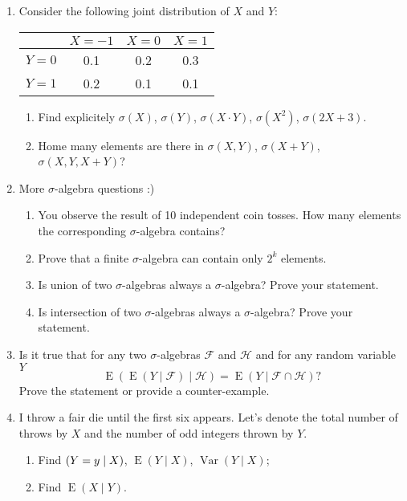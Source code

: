 \documentclass[12pt]{article}
\DeclareMathOperator{\Var}{Var}
\DeclareMathOperator{\E}{E}
\let\P\relax
\DeclareMathOperator{\P}{\mathbb{P}}
\begin{document}
\begin{enumerate}

\item 
  Consider the following joint distribution of $X$ and $Y$:

  \begin{tabular}{*{4}{c}}
  \toprule
  & $X=-1$ & $X=0$ & $X=1$ \\
  \midrule
  $Y=0$ & 0.1 & 0.2 & 0.3  \\
  $Y=1$ & 0.2 & 0.1 & 0.1  \\
  \bottomrule
  \end{tabular}
  
  \begin{enumerate}
   \item Find explicitely $\sigma(X)$, $\sigma(Y)$, $\sigma(X \cdot Y)$, $\sigma(X^2)$, $\sigma(2X+3)$.
   \item Home many elements are there in $\sigma(X, Y)$, $\sigma(X + Y)$, $\sigma(X, Y, X+Y)$?
  \end{enumerate}
  

\item More $\sigma$-algebra questions :)
\begin{enumerate}
  \item You observe the result of 10 independent coin tosses. How many elements the corresponding $\sigma$-algebra contains?
  \item Prove that a finite $\sigma$-algebra can contain only $2^k$ elements.
  \item Is union of two $\sigma$-algebras always a $\sigma$-algebra? Prove your statement.
  \item Is intersection of two $\sigma$-algebras always a $\sigma$-algebra? Prove your statement.
\end{enumerate}

\item 
Is it true that for any two $\sigma$-algebras $\mathcal{F}$ and $\mathcal{H}$ and for any random variable $Y$
\[
  \E(\E(Y \mid \mathcal F) \mid \mathcal H) = \E(Y \mid \mathcal F \cap \mathcal H)?
\]
Prove the statement or provide a counter-example.
\item I throw a fair die until the first six appears. 
Let's denote the total number of throws by $X$ and the number of odd integers thrown by $Y$.

\begin{enumerate}
  \item Find $\P(Y=y \mid X)$, $\E(Y \mid X)$, $\Var(Y \mid X)$;
  \item Find $\E(X \mid Y)$.
\end{enumerate}


\end{enumerate}
\end{document}
